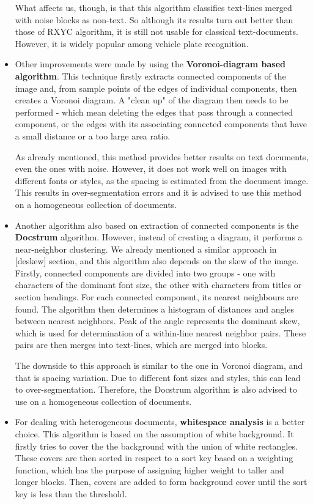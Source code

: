 \begin{itemize}
What affects us, though, is that this algorithm classifies text-lines merged with noise blocks as non-text. So although its results turn out better than those of RXYC algorithm, it is still not usable for classical text-documents. However, it is widely popular among vehicle plate recognition.

\item Other improvements were made by using the \textbf{Voronoi-diagram based algorithm}. This technique firstly extracts connected components of the image and, from sample points of the edges of individual components, then creates a Voronoi diagram. A "clean up" of the diagram then needs to be performed - which mean deleting the edges that pass through a connected component, or the edges with its associating connected components that have a small distance or a too large area ratio.

As already mentioned, this method provides better results on text documents, even the ones with noise. However, it does not work well on images with different fonts or styles, as the spacing is estimated from the document image. This results in over-segmentation errors and it is advised to use this method on a homogeneous collection of documents.

\item Another algorithm also based on extraction of connected components is the \textbf{Docstrum} algorithm. However, instead of creating a diagram, it performs a near-neighbor clustering. We already mentioned a similar approach in [deskew] section, and this algorithm also depends on the skew of the image. Firstly, connected components are divided into two groups - one with characters of the dominant font size, the other with characters from titles or section headings. For each connected component, its nearest neighbours are found. The algorithm then determines a histogram of distances and angles between nearest neighbors. Peak of the angle represents the dominant skew, which is used for determination of a within-line nearest neighbor pairs. These pairs are then merges into text-lines, which are merged into blocks.

The downside to this approach is similar to the one in Voronoi diagram, and that is spacing variation. Due to different font sizes and styles, this can lead to over-segmentation. Therefore, the Docstrum algorithm is also advised to use on a homogeneous collection of documents.

\item For dealing with heterogeneous documents, \textbf{whitespace analysis} is a better choice. This algorithm is based on the assumption of white background. It firstly tries to cover the the background with the union of white rectangles. These covers are then sorted in respect to a sort key based on a weighting function, which has the purpose of assigning higher weight to taller and longer blocks. Then, covers are added to form background cover until the sort key is less than the threshold.


\end{itemize}
